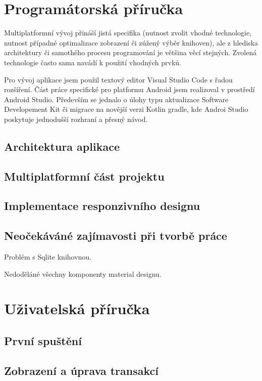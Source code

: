 \documentclass[
  biblatex,
  figures=false,
  tables=false,
  glossaries,
  index
]{kidiplom}
\begin{document}
\section{Programátorská příručka}

Multiplatformní vývoj přináší jistá specifika (nutnost zvolit vhodné technologie, nutnost případné optimalizace zobrazení či zúžený výběr knihoven), ale z hlediska architektury či samothého procesu programování je většina věcí stejných. Zvolená technologie často sama navádí k použití vhodných prvků.

Pro vývoj aplikace jsem použil textový editor Visual Studio Code s řadou rozšíření. Část práce specifické pro platformu Android jsem realizoval v prostředí Android Studio. Především se jednalo o úlohy typu aktualizace Software Developement Kit či migrace na novější verzi Kotlin gradle, kde Androi Studio poskytuje jednodušší rozhraní a přesný návod.

\subsection{Architektura aplikace}

\subsection{Multiplatformní část projektu}


\subsection{Implementace responzivního designu}

\subsection{Neočekáváné zajímavosti při tvorbě práce}

Problém s Sqlite knihovnou.

Nedoděláné všechny komponenty material designu.


\section{Uživatelská příručka}

\subsection{První spuštění}

\subsection{Zobrazení a úprava transakcí}
\end{document}
